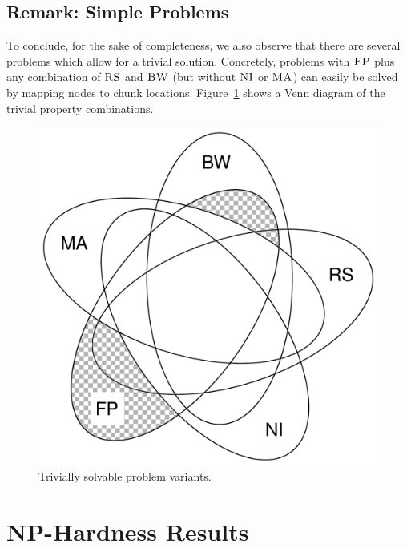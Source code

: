 \documentclass[9pt]{sigcomm-alternate}
\newcommand{\carlo}[1]{\textcolor{red}{carlo: #1}}
\newcommand{\CC}{\textsc{NI}}
\newcommand{\FP}{\textsc{FP}}
\newcommand{\RS}{\textsc{RS}}
\newcommand{\BW}{\textsc{BW}}
\newcommand{\MA}{\textsc{MA}}
\begin{document}

\subsection{Remark: Simple Problems}

To conclude, for the sake of completeness, we also observe that there are
several problems which
allow for a trivial solution. Concretely, problems with $\FP$
plus any combination of
$\RS$ and $\BW$ (but without $\CC$ or $\MA$) can easily be solved by mapping nodes to chunk locations.
Figure~\ref{fig:venn_trivial}
shows a Venn diagram of the trivial property combinations.

\begin{figure}
\includegraphics[width=0.48\columnwidth]{figs/venn_trivial.pdf}
\caption{Trivially solvable problem variants.}
\label{fig:venn_trivial}
\end{figure}


\section{NP-Hardness Results}\label{sec:np}

\end{document}
